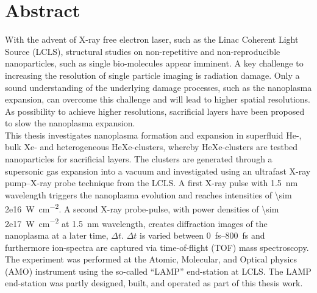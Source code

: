 \section*{Abstract}\label{ch:abstract}
With the advent of X-ray free electron laser, such as the Linac Coherent Light Source (LCLS), structural studies on non-repetitive and non-reproducible nanoparticles, such as single bio-molecules appear imminent. A key challenge to increasing the resolution of single particle imaging is radiation damage. Only a sound understanding of the underlying damage processes, such as the nanoplasma expansion, can overcome this challenge and will lead to higher spatial resolutions. As possibility to achieve higher resolutions, sacrificial layers have been proposed to slow the nanoplasma expansion.\\[0.4\baselineskip]
%
This thesis investigates nanoplasma formation and expansion in superfluid He-, bulk Xe- and heterogeneous HeXe-clusters, whereby HeXe-clusters are testbed nanoparticles for sacrificial layers. The clusters are generated through a supersonic gas expansion into a vacuum and investigated using an ultrafast X-ray pump--X-ray probe technique from the LCLS. A first X-ray pulse with \SI{1.5}{\nano\meter} wavelength triggers the nanoplasma evolution and reaches intensities of \SI{\sim 2e16}{\watt\per\square\centi\meter}. A second X-ray probe-pulse, with power densities of \SI{\sim 2e17}{\watt\per\square\centi\meter} at \SI{1.5}{\nano\meter} wavelength, creates diffraction images of the nanoplasma at a later time, $\Delta t$. $\Delta t$ is varied between \SIrange{0}{800}{\femto\second} and furthermore ion-spectra are captured via time-of-flight (TOF) mass spectroscopy. The experiment was performed at the Atomic, Molecular, and Optical physics (AMO) instrument using the so-called ``LAMP'' end-station at LCLS. The LAMP end-station was partly designed, built, and operated as part of this thesis work.\\[0.4\baselineskip]
%
